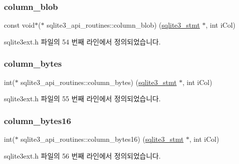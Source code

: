 \subsubsection{\texorpdfstring{column\+\_\+blob}{column\_blob}}
{\footnotesize\ttfamily const void$\ast$($\ast$ sqlite3\+\_\+api\+\_\+routines\+::column\+\_\+blob) (\hyperlink{sqlite3_8h_af2a033da1327cdd77f0a174a09aedd0c}{sqlite3\+\_\+stmt} $\ast$, int i\+Col)}



sqlite3ext.\+h 파일의 54 번째 라인에서 정의되었습니다.

\mbox{\label{structsqlite3__api__routines_a4925c38851818eebce76de641da69636}} 
\subsubsection{\texorpdfstring{column\+\_\+bytes}{column\_bytes}}
{\footnotesize\ttfamily int($\ast$ sqlite3\+\_\+api\+\_\+routines\+::column\+\_\+bytes) (\hyperlink{sqlite3_8h_af2a033da1327cdd77f0a174a09aedd0c}{sqlite3\+\_\+stmt} $\ast$, int i\+Col)}



sqlite3ext.\+h 파일의 55 번째 라인에서 정의되었습니다.

\mbox{\label{structsqlite3__api__routines_a7355fc82d2138b79b2e188fd2de4d269}} 
\subsubsection{\texorpdfstring{column\+\_\+bytes16}{column\_bytes16}}
{\footnotesize\ttfamily int($\ast$ sqlite3\+\_\+api\+\_\+routines\+::column\+\_\+bytes16) (\hyperlink{sqlite3_8h_af2a033da1327cdd77f0a174a09aedd0c}{sqlite3\+\_\+stmt} $\ast$, int i\+Col)}



sqlite3ext.\+h 파일의 56 번째 라인에서 정의되었습니다.

\mbox{\label{structsqlite3__api__routines_a3a41d82a8b13513a505889c8c9b1c97e}} 
